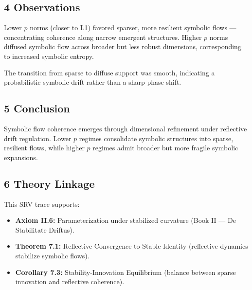 \subsection*{4 Observations}
\label{subsection:trace4_observations}

Lower $p$ norms (closer to L1) favored sparser, more resilient symbolic flows — concentrating coherence along narrow emergent structures. Higher $p$ norms diffused symbolic flow across broader but less robust dimensions, corresponding to increased symbolic entropy.

The transition from sparse to diffuse support was smooth, indicating a probabilistic symbolic drift rather than a sharp phase shift.

\subsection*{5 Conclusion}
\label{subsection:trace4_conclusion}

Symbolic flow coherence emerges through dimensional refinement under reflective drift regulation. Lower $p$ regimes consolidate symbolic structures into sparse, resilient flows, while higher $p$ regimes admit broader but more fragile symbolic expansions.

\subsection*{6 Theory Linkage}
\label{subsection:trace4_theory_linkage}

This SRV trace supports:
\begin{itemize}
    \item \textbf{Axiom II.6:} Parameterization under stabilized curvature (Book II — De Stabilitate Driftus).
    \item \textbf{Theorem 7.1:} Reflective Convergence to Stable Identity (reflective dynamics stabilize symbolic flows).
    \item \textbf{Corollary 7.3:} Stability-Innovation Equilibrium (balance between sparse innovation and reflective coherence).
\end{itemize}
